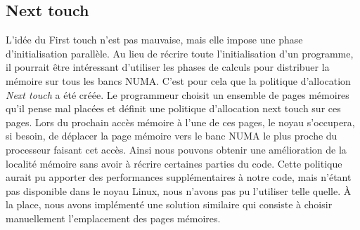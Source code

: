 \subsection{Next touch}
\label{sec:next_touch}
L'idée du First touch n'est pas mauvaise, mais elle impose une phase d'initialisation parallèle.
%
Au lieu de récrire toute l'initialisation d'un programme, il pourrait être intéressant d'utiliser les phases de calculs pour distribuer la mémoire sur tous les bancs NUMA.
%
C'est pour cela que la politique d'allocation {\em Next touch} a été créée.
%
Le programmeur choisit un ensemble de pages mémoires qu'il pense mal placées et définit une politique d'allocation next touch sur ces pages.
%
Lors du prochain accès mémoire à l'une de ces pages, le noyau s'occupera, si besoin, de déplacer la page mémoire vers le banc NUMA le plus proche du processeur faisant cet accès.
%
Ainsi nous pouvons obtenir une amélioration de la localité mémoire sans avoir à récrire certaines parties du code.
%
Cette politique aurait pu apporter des performances supplémentaires à notre code, mais n'étant pas disponible dans le noyau Linux, nous n'avons pas pu l'utiliser telle quelle.
%
\`A la place, nous avons implémenté une solution similaire qui consiste à choisir manuellement l'emplacement des pages mémoires.
